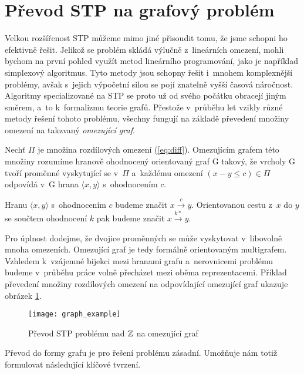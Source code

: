 \section{Převod STP na grafový problém}\label{graf}

Velkou rozšířenost STP můžeme mimo jiné přisoudit tomu, že jsme schopni ho efektivně řešit. Jelikož se problém skládá výlučně z~lineárních omezení, mohli bychom na první pohled využít metod lineárního programování, jako je například simplexový algoritmus. Tyto metody jsou schopny řešit i~mnohem komplexnější problémy, avšak s~jejich výpočetní silou se pojí znatelně vyšší časová náročnost. Algoritmy specializované na STP se proto už od svého počátku \cite[Kapitola 2]{Dechter91} obracejí jiným směrem, a~to k~formalizmu teorie grafů. Přestože v~průběhu let vzikly různé metody řešení tohoto problému, všechny fungují na základě převedení množiny omezení na takzvaný \emph{omezující graf}.

\begin{definice}
	Nechť $\Pi$ je množina rozdílových omezení (\ref{eq:diff}). Omezujícím grafem této množiny rozumíme hranově ohodnocený orientovaný graf G takový, že vrcholy G tvoří proměnné vyskytující se v~$\Pi$ a~každému omezení $(x-y \leq c) \in \Pi$ odpovídá v~G hrana $\langle x,y\rangle$ s~ohodnocením $c$.
\end{definice}
\begin{pozn}
	Hranu $\langle x,y\rangle$ s~ohodnocením $c$ budeme značit $x \xrightarrow{c} y$. Orientovanou cestu z~$x$ do $y$ se součtem ohodnocení $k$ pak budeme značit $x \xrightarrow{k*} y$.
\end{pozn}

Pro úplnost dodejme, že dvojice proměnných se může vyskytovat v~libovolně mnoha omezeních. Omezující graf je tedy formálně orientovaným multigrafem. Vzhledem k~vzájemné bijekci mezi hranami grafu a~nerovnicemi problému budeme v~průběhu práce volně přecházet mezi oběma reprezentacemi. Příklad převedení množiny rozdílových omezení na odpovídající omezující graf ukazuje obrázek \ref{fig:graph}.

\begin{figure}
	\centering
	\texttt{[image: graph\_example]}
	\caption{Převod STP problému nad $\mathbb{Z}$ na omezující graf}
	\label{fig:graph}
\end{figure}

Převod do formy grafu je pro řešení problému zásadní. Umožňuje nám totiž formulovat následující klíčové tvrzení.


